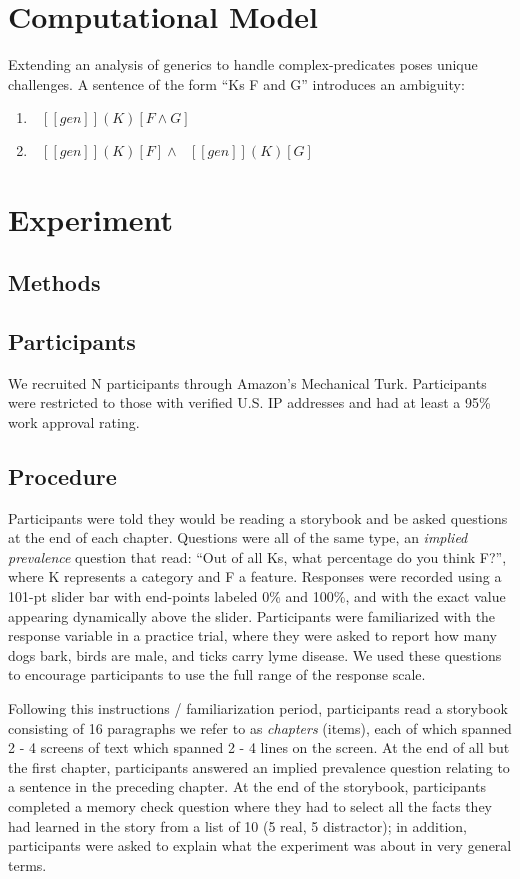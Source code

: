 \documentclass[10pt,letterpaper]{article}
\providecommand{\tightlist}{%
  \setlength{\itemsep}{0pt}\setlength{\parskip}{0pt}}
\newcommand{\denote}[1]{\mbox{ $[\![ #1 ]\!]$}}
\begin{document}
\section{Computational Model}

Extending an analysis of generics to handle complex-predicates poses unique challenges.
A sentence of the form ``Ks F and G'' introduces an ambiguity:

\begin{enumerate}
\tightlist
\item $\denote{gen}(K) [F \land G]$
\item $\denote{gen}(K) [F] \land \denote{gen}(K) [G]$
\end{enumerate}


\section{Experiment}

\subsection{Methods}

\subsection{Participants}
We recruited N participants through Amazon's Mechanical Turk.
Participants were restricted to those with verified U.S. IP addresses and had at least a 95\% work approval rating. 

\subsection{Procedure}
Participants were told they would be reading a storybook and be asked questions at the end of each chapter. 
Questions were all of the same type, an \emph{implied prevalence} question \cite{Gelman2002, Cimpian2010} that read: ``Out of all Ks, what percentage do you think F?'', where K represents a category and F a feature. 
Responses were recorded using a 101-pt slider bar with end-points labeled 0\% and 100\%, and with the exact value appearing dynamically above the slider. 
Participants were familiarized with the response variable in a practice trial, where they were asked to report how many dogs bark, birds are male, and ticks carry lyme disease. 
We used these questions to encourage participants to use the full range of the response scale. 

Following this instructions / familiarization period, participants read a storybook consisting of 16 paragraphs we refer to as \emph{chapters} (items), each of which spanned 2 - 4 screens of text which spanned 2 - 4 lines on the screen. 
At the end of all but the first chapter, participants answered an implied prevalence question relating to a sentence in the preceding chapter. 
At the end of the storybook, participants completed a memory check question where they had to select all the facts they had learned in the story from a list of 10 (5 real, 5 distractor); in addition, participants were asked to explain what the experiment was about in very general terms.
\end{document}
